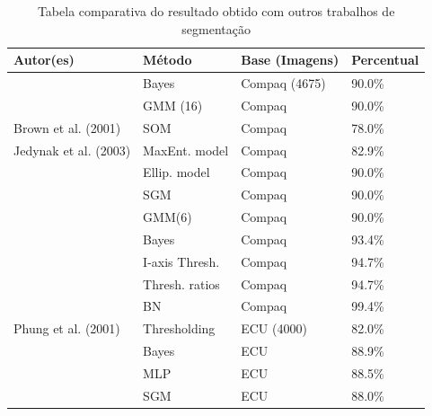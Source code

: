 \documentclass[12pt,oneside,a4paper,english,french,spanish,brazil,]{abntex2}
\begin{document}
\begin{table}
\centering
\caption{Tabela comparativa do resultado obtido com outros trabalhos de segmentação }
\label{tab:ComparativoResultados}
\begin{tabular}{llll}
\hline
\textbf{Autor(es)}           & \textbf{Método} & \textbf{Base (Imagens)}         & \textbf{Percentual} \\ \hline
\citet{jones:2002}           & Bayes                          & Compaq (4675) & 90.0\%              \\
                             & GMM (16)                       & Compaq                & 90.0\%              \\
Brown et al. (2001)\nocite{brown:2001}           & SOM                            & Compaq                & 78.0\%              \\
Jedynak et al. (2003) \nocite{jedynak:2003}         & MaxEnt. model                  & Compaq                & 82.9\%              \\
\citet{lee:2002}             & Ellip. model                   & Compaq                & 90.0\%              \\
                             & SGM                            & Compaq                & 90.0\%              \\
                             & GMM(6)                         & Compaq                & 90.0\%              \\
\citet{brand:2000}           & Bayes                          & Compaq                & 93.4\%              \\
                             & I-axis Thresh.                 & Compaq                & 94.7\%              \\
                             & Thresh. ratios                 & Compaq                & 94.7\%              \\
\citet{sebe:2004}            & BN                             & Compaq                & 99.4\%              \\
Phung et al. (2001)\nocite{phung:2001}           & Thresholding                   & ECU (4000)    & 82.0\%              \\
                             & Bayes                          & ECU                   & 88.9\%              \\
                             & MLP                            & ECU                   & 88.5\%              \\
                             & SGM                            & ECU                   & 88.0\%              \\

\end{tabular}
\end{table}
\end{document}

